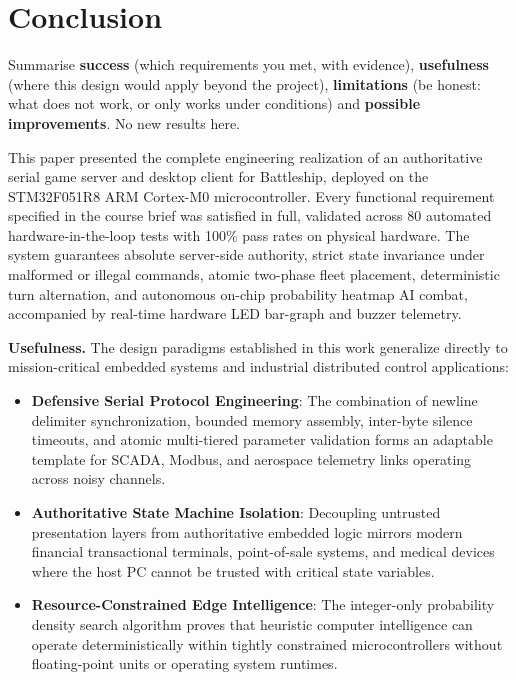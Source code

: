 \section{Conclusion}
\label{sec:conclusion}

\begin{guidance}
Summarise \textbf{success} (which requirements you met, with evidence),
\textbf{usefulness} (where this design would apply beyond the project),
\textbf{limitations} (be honest: what does not work, or only works under
conditions) and \textbf{possible improvements}. No new results here.
\end{guidance}

This paper presented the complete engineering realization of an authoritative serial game server and desktop client for Battleship, deployed on the STM32F051R8 ARM Cortex-M0 microcontroller. Every functional requirement specified in the course brief was satisfied in full, validated across 80 automated hardware-in-the-loop tests with 100\% pass rates on physical hardware. The system guarantees absolute server-side authority, strict state invariance under malformed or illegal commands, atomic two-phase fleet placement, deterministic turn alternation, and autonomous on-chip probability heatmap AI combat, accompanied by real-time hardware LED bar-graph and buzzer telemetry.

\textbf{Usefulness.} The design paradigms established in this work generalize directly to mission-critical embedded systems and industrial distributed control applications:
\begin{itemize}
    \item \textbf{Defensive Serial Protocol Engineering}: The combination of newline delimiter synchronization, bounded memory assembly, inter-byte silence timeouts, and atomic multi-tiered parameter validation forms an adaptable template for SCADA, Modbus, and aerospace telemetry links operating across noisy channels.
    \item \textbf{Authoritative State Machine Isolation}: Decoupling untrusted presentation layers from authoritative embedded logic mirrors modern financial transactional terminals, point-of-sale systems, and medical devices where the host PC cannot be trusted with critical state variables.
    \item \textbf{Resource-Constrained Edge Intelligence}: The integer-only probability density search algorithm proves that heuristic computer intelligence can operate deterministically within tightly constrained microcontrollers without floating-point units or operating system runtimes.
\end{itemize}

